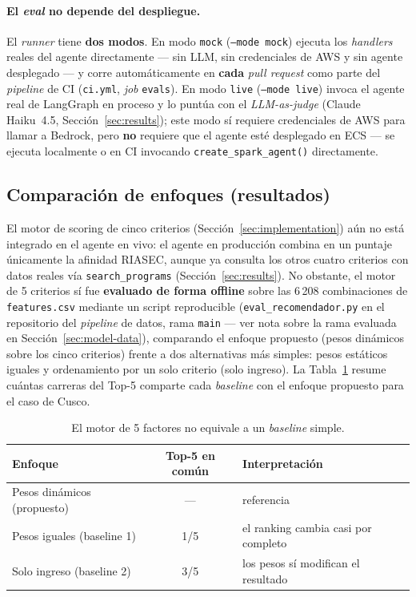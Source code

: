 \paragraph{El \emph{eval} no depende del despliegue.} El \emph{runner} tiene
\textbf{dos modos}. En modo \texttt{mock} (\texttt{--mode mock}) ejecuta los
\emph{handlers} reales del agente directamente --- sin LLM, sin credenciales
de AWS y sin agente desplegado --- y corre autom\'aticamente en \textbf{cada}
\emph{pull request} como parte del \emph{pipeline} de CI (\texttt{ci.yml},
\emph{job} \texttt{evals}). En modo \texttt{live} (\texttt{--mode live})
invoca el agente real de LangGraph en proceso y lo punt\'ua con el
\emph{LLM-as-judge} (Claude Haiku~4.5, Secci\'on~\ref{sec:results}); este
modo s\'i requiere credenciales de AWS para llamar a Bedrock, pero
\textbf{no} requiere que el agente est\'e desplegado en ECS --- se ejecuta
localmente o en CI invocando \texttt{create\_spark\_agent()} directamente.

\subsection{Comparaci\'on de enfoques (resultados)}

El motor de scoring de cinco criterios (Secci\'on~\ref{sec:implementation})
a\'un no est\'a integrado en el agente en vivo: el agente en producci\'on
combina en un puntaje \'unicamente la afinidad RIASEC, aunque ya consulta los
otros cuatro criterios con datos reales v\'ia \texttt{search\_programs}
(Secci\'on~\ref{sec:results}). No obstante, el motor de 5 criterios s\'i fue
\textbf{evaluado de forma offline} sobre las 6\,208
combinaciones de \texttt{features.csv} mediante un script reproducible
(\texttt{eval\_recomendador.py} en el repositorio del \emph{pipeline} de
datos, rama \texttt{main} --- ver nota sobre la rama evaluada en
Secci\'on~\ref{sec:model-data}),
comparando el enfoque propuesto (pesos din\'amicos sobre los cinco criterios)
frente a dos alternativas m\'as simples: pesos est\'aticos iguales y ordenamiento
por un solo criterio (solo ingreso). La Tabla~\ref{tab:comparacion-enfoques}
resume cu\'antas carreras del Top-5 comparte cada \emph{baseline} con el enfoque
propuesto para el caso de Cusco.
\begin{table}[H]
\centering
\begin{tabular}{@{}lcl@{}}
\toprule
Enfoque & Top-5 en com\'un & Interpretaci\'on \\
\midrule
Pesos din\'amicos (propuesto) & --- & referencia \\
Pesos iguales (baseline 1)    & 1/5 & el ranking cambia casi por completo \\
Solo ingreso (baseline 2)     & 3/5 & los pesos s\'i modifican el resultado \\
\bottomrule
\end{tabular}
\caption{El motor de 5 factores no equivale a un \emph{baseline} simple.}
\label{tab:comparacion-enfoques}
\end{table}


